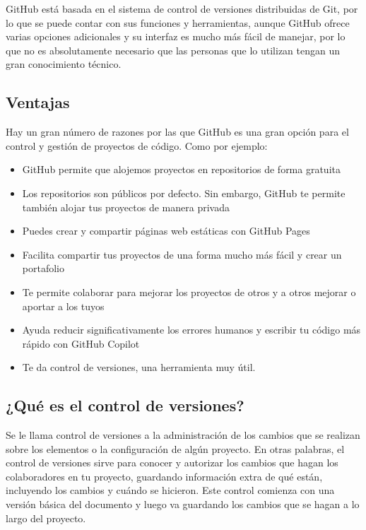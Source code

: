 \documentclass[paper=a4, fontsize=9pt]{article}
\begin{document}
GitHub está basada en el sistema de control de versiones distribuidas de Git, por lo que se puede contar con sus funciones y herramientas, aunque GitHub ofrece varias opciones adicionales y su interfaz es mucho más fácil de manejar, por lo que no es absolutamente necesario que las personas que lo utilizan tengan un gran conocimiento técnico.

\subsection{Ventajas}

Hay un gran número de razones por las que GitHub es una gran opción para el control y gestión de proyectos de código. Como por ejemplo:
  
  \begin{itemize}

\item GitHub permite que alojemos proyectos en repositorios de forma gratuita
\item Los repositorios son públicos por defecto. Sin embargo, GitHub te permite también alojar tus proyectos de manera privada
\item Puedes crear y compartir páginas web estáticas con GitHub Pages
\item Facilita compartir tus proyectos de una forma mucho más fácil y crear un portafolio
\item Te permite colaborar para mejorar los proyectos de otros y a otros mejorar o aportar a los tuyos
\item Ayuda reducir significativamente los errores humanos y escribir tu código más rápido con GitHub Copilot
\item Te da control de versiones, una herramienta muy útil.

\end{itemize}

\subsection{¿Qué es el control de versiones?}

Se le llama control de versiones a la administración de los cambios que se realizan sobre los elementos o la configuración de algún proyecto. En otras palabras, el control de versiones sirve para conocer y autorizar los cambios que hagan los colaboradores en tu proyecto, guardando información extra de qué están, incluyendo los cambios y cuándo se hicieron. Este control comienza con una versión básica del documento y luego va guardando los cambios que se hagan a lo largo del proyecto.
\end{document}
